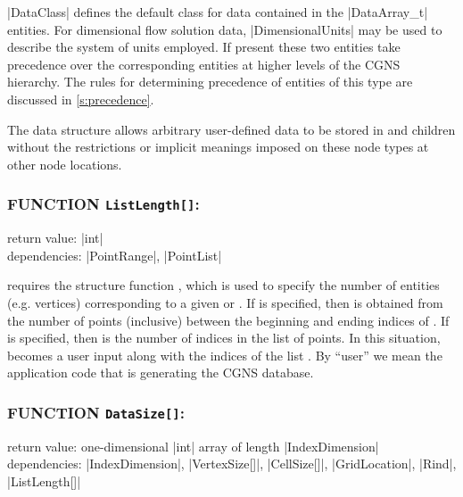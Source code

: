 |DataClass| defines the default class for data contained in the
|DataArray_t| entities.  For dimensional flow solution data,
|DimensionalUnits| may be used to describe the system of units employed.
If present these two entities take precedence over the corresponding entities
at higher levels of the CGNS hierarchy.  The rules for determining precedence
of entities of this type are discussed in \autoref{s:precedence}.

The  data structure allows arbitrary
user-defined data to be stored in  and
 children without the restrictions or implicit
meanings imposed on these node types at other node locations.

\subsubsection*{FUNCTION \texttt{ListLength[]}:}

\noindent return value: |int| \\
\noindent dependencies: |PointRange|, |PointList|

 requires the structure function , which
is used to specify the number of entities (e.g. vertices) corresponding to a
given  or . If
 is specified, then  is obtained from
the number of points (inclusive) between the beginning and ending indices of
. If  is specified, then
 is the number of indices in the list of points. In this
situation,  becomes a user input along with the indices of the
list . By ``user'' we mean the application code that is
generating the CGNS database.

\subsubsection*{FUNCTION \texttt{DataSize[]}:}

\noindent return value: one-dimensional |int| array of length
                        |IndexDimension| \\
\noindent dependencies: |IndexDimension|, |VertexSize[]|, |CellSize[]|,
                        |GridLocation|, |Rind|, |ListLength[]|


